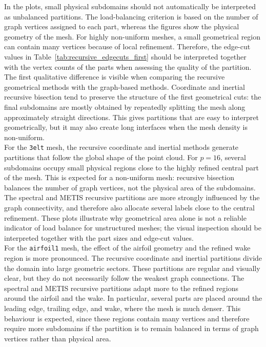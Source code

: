 \documentclass[unicode,10pt,a4paper,oneside,numbers=endperiod,openany]{scrartcl}
\begin{document}
In the plots, small physical subdomains should not automatically be interpreted as unbalanced
partitions. The load-balancing criterion is based on the number of graph vertices assigned to each
part, whereas the figures show the physical geometry of the mesh. For highly non-uniform meshes,
a small geometrical region can contain many vertices because of local refinement. Therefore, the
edge-cut values in Table~\ref{tab:recursive_edgecuts_first} should be interpreted together with the
vertex counts of the parts when assessing the quality of the partition.\\

The first qualitative difference is visible when comparing the recursive geometrical methods with
the graph-based methods. Coordinate and inertial recursive bisection tend to preserve the
structure of the first geometrical cuts: the final subdomains are mostly obtained by repeatedly
splitting the mesh along approximately straight directions. This gives partitions that are easy to
interpret geometrically, but it may also create long interfaces when the mesh density is non-uniform.\\

For the \texttt{3elt} mesh, the recursive coordinate and inertial methods generate partitions that
follow the global shape of the point cloud. For \(p=16\), several subdomains occupy small physical
regions close to the highly refined central part of the mesh. This is expected for a non-uniform mesh:
recursive bisection balances the number of graph vertices, not the physical area of the subdomains.
The spectral and METIS recursive partitions are more strongly influenced by the graph connectivity,
and therefore also allocate several labels close to the central refinement. These plots illustrate why
geometrical area alone is not a reliable indicator of load balance for unstructured meshes; the visual
inspection should be interpreted together with the part sizes and edge-cut values.\\

For the \texttt{airfoil1} mesh, the effect of the airfoil geometry and the refined wake region is more
pronounced. The recursive coordinate and inertial partitions divide the domain into large geometric
sectors. These partitions are regular and visually clear, but they do not necessarily follow the
weakest graph connections. The spectral and METIS recursive partitions adapt more to the refined
regions around the airfoil and the wake. In particular, several parts are placed around the leading
edge, trailing edge, and wake, where the mesh is much denser. This behaviour is expected, since
these regions contain many vertices and therefore require more subdomains if the partition is to
remain balanced in terms of graph vertices rather than physical area.\\
\end{document}
